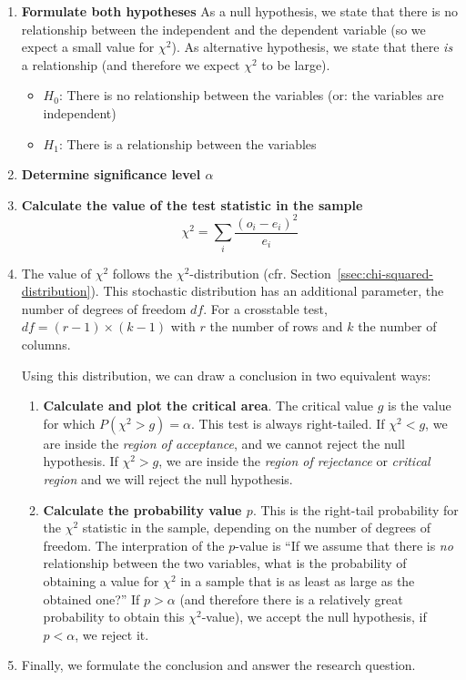 \begin{enumerate}
  \item \textbf{Formulate both hypotheses}
  As a null hypothesis, we state that there is no relationship between the independent and the dependent variable (so we expect a small value for $\chi^2$).
  As alternative hypothesis, we state that there \emph{is} a relationship (and therefore we expect $\chi^2$ to be large).
  \begin{itemize}
    \item $H_{0}$: There is no relationship between the variables (or: the variables are independent)
    \item $H_{1}$: There is a relationship between the variables
  \end{itemize}

  \item \textbf{Determine significance level $\alpha$}
  
  \item \textbf{Calculate the value of the test statistic in the sample}
  \[ \chi^{2} = \sum_{i} \frac{(o_{i} - e_{i})^{2}}{e_{i}} \]

  \item The value of $\chi^2$ follows the $\chi^2$-distribution (cfr. Section~\ref{ssec:chi-squared-distribution}). This stochastic distribution has an additional parameter, the number of degrees of freedom $df$. For a crosstable test, $df = (r - 1) \times (k - 1)$ with $r$ the number of rows and $k$ the number of columns.

  Using this distribution, we can draw a conclusion in two equivalent ways:
  \begin{enumerate}
    \item \textbf{Calculate and plot the critical area}. The critical value $g$ is the value for which $P(\chi^2 > g) = \alpha$. This test is always right-tailed. If $\chi^2 < g$, we are inside the \emph{region of acceptance}, and we cannot reject the null hypothesis. If $\chi^2 > g$, we are inside the \emph{region of rejectance} or \emph{critical region} and we will reject the null hypothesis.
    \item \textbf{Calculate the probability value $p$}. This is the right-tail probability for the $\chi^2$ statistic in the sample, depending on the number of degrees of freedom. The interpration of the $p$-value is ``If we assume that there is \emph{no} relationship between the two variables, what is the probability of obtaining a value for $\chi^2$ in a sample that is as least as large as the obtained one?'' If $p > \alpha$ (and therefore there is a relatively great probability to obtain this $\chi^2$-value), we accept the null hypothesis, if $p < \alpha$, we reject it.
  \end{enumerate}

  \item Finally, we formulate the conclusion and answer the research question.
\end{enumerate}  

